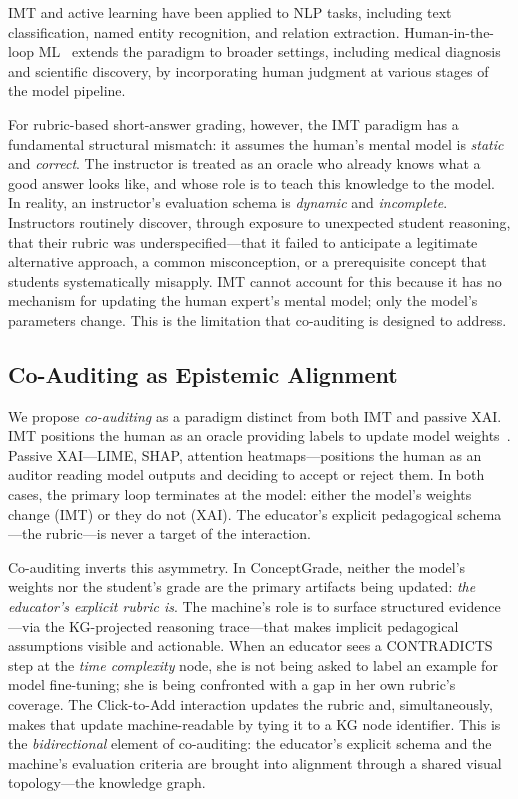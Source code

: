 \documentclass[journal,review]{vgtc}
\begin{document}
IMT and active learning have been applied to NLP tasks, including text classification, named entity recognition, and relation extraction. Human-in-the-loop ML~\cite{Holzinger2016} extends the paradigm to broader settings, including medical diagnosis and scientific discovery, by incorporating human judgment at various stages of the model pipeline.

For rubric-based short-answer grading, however, the IMT paradigm has a fundamental structural mismatch: it assumes the human's mental model is \textit{static} and \textit{correct}. The instructor is treated as an oracle who already knows what a good answer looks like, and whose role is to teach this knowledge to the model. In reality, an instructor's evaluation schema is \textit{dynamic} and \textit{incomplete}. Instructors routinely discover, through exposure to unexpected student reasoning, that their rubric was underspecified---that it failed to anticipate a legitimate alternative approach, a common misconception, or a prerequisite concept that students systematically misapply. IMT cannot account for this because it has no mechanism for updating the human expert's mental model; only the model's parameters change. This is the limitation that co-auditing is designed to address.

\subsection{Co-Auditing as Epistemic Alignment}

We propose \textit{co-auditing} as a paradigm distinct from both IMT and passive XAI. IMT positions the human as an oracle providing labels to update model weights~\cite{Amershi2014,Simard2017}. Passive XAI---LIME, SHAP, attention heatmaps---positions the human as an auditor reading model outputs and deciding to accept or reject them. In both cases, the primary loop terminates at the model: either the model's weights change (IMT) or they do not (XAI). The educator's explicit pedagogical schema---the rubric---is never a target of the interaction.

Co-auditing inverts this asymmetry. In ConceptGrade, neither the model's weights nor the student's grade are the primary artifacts being updated: \textit{the educator's explicit rubric is}. The machine's role is to surface structured evidence---via the KG-projected reasoning trace---that makes implicit pedagogical assumptions visible and actionable. When an educator sees a CONTRADICTS step at the \textit{time complexity} node, she is not being asked to label an example for model fine-tuning; she is being confronted with a gap in her own rubric's coverage. The Click-to-Add interaction updates the rubric and, simultaneously, makes that update machine-readable by tying it to a KG node identifier. This is the \textit{bidirectional} element of co-auditing: the educator's explicit schema and the machine's evaluation criteria are brought into alignment through a shared visual topology---the knowledge graph.
\end{document}
